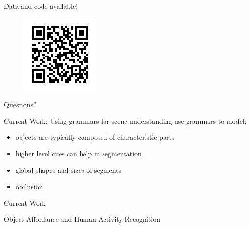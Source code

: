 \documentclass{beamer}
\begin{document}
\begin{frame}
\begin{block}{Data and code available!}
 \begin{figure}   
\includegraphics[width=0.25\linewidth]{qr.png}
 \end{figure}
\end{block}

\begin{block}{}

\begin{center}

{\Huge 
Questions?
}

\end{center}

\end{block}

\end{frame}

\begin{frame}{Current Work: Using grammars for scene understanding}
use grammars to model:
\begin{itemize}
\item objects are typically composed of characteristic parts
\item higher level cues can help in segmentation
\item global shapes and sizes of segments
\item occlusion
\end{itemize}

\end{frame}


\begin{frame}{Current Work}
\begin{center}
{\huge
Object Affordance and Human Activity Recognition
}
\end{center}
\end{frame}
\end{document}
